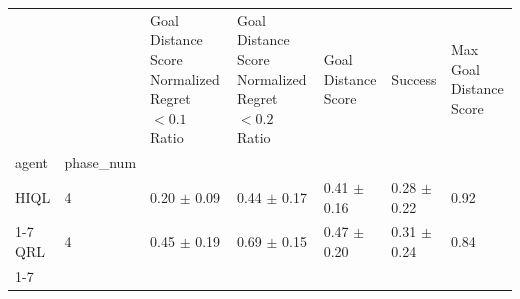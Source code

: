 \begin{tabular}{lllllll}
\toprule
 &  & Goal Distance Score Normalized Regret $< 0.1$ Ratio & Goal Distance Score Normalized Regret $< 0.2$ Ratio & Goal Distance Score & Success & Max Goal Distance Score \\
agent & phase_num &  &  &  &  &  \\
\midrule
HIQL & 4 & 0.20 $\pm$ 0.09 & 0.44 $\pm$ 0.17 & 0.41 $\pm$ 0.16 & 0.28 $\pm$ 0.22 & 0.92 \\
\cline{1-7}
QRL & 4 & 0.45 $\pm$ 0.19 & 0.69 $\pm$ 0.15 & 0.47 $\pm$ 0.20 & 0.31 $\pm$ 0.24 & 0.84 \\
\cline{1-7}
\bottomrule
\end{tabular}
